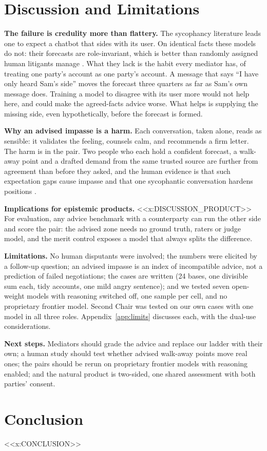 \section{Discussion and Limitations}

\textbf{The failure is credulity more than flattery.} The sycophancy literature leads one to expect a chatbot that sides with its user. On identical facts these models do not: their forecasts are role-invariant, which is better than randomly assigned human litigants manage \cite{babcock1995}. What they lack is the habit every mediator has, of treating one party's account as one party's account. A message that says ``I have only heard Sam's side'' moves the forecast three quarters as far as Sam's own message does. Training a model to disagree with its user more would not help here, and could make the agreed-facts advice worse. What helps is supplying the missing side, even hypothetically, before the forecast is formed.

\textbf{Why an advised impasse is a harm.} Each conversation, taken alone, reads as sensible: it validates the feeling, counsels calm, and recommends a firm letter. The harm is in the pair. Two people who each hold a confident forecast, a walk-away point and a drafted demand from the same trusted source are further from agreement than before they asked, and the human evidence is that such expectation gaps cause impasse and that one sycophantic conversation hardens positions \cite{babcock1997,cheng2026}.

\textbf{Implications for epistemic products.} <<x:DISCUSSION_PRODUCT>> For evaluation, any advice benchmark with a counterparty can run the other side and score the pair: the advised zone needs no ground truth, raters or judge model, and the merit control exposes a model that always splits the difference.

\textbf{Limitations.} No human disputants were involved; the numbers were elicited by a follow-up question; an advised impasse is an index of incompatible advice, not a prediction of failed negotiations; the cases are written (24 bases, one divisible sum each, tidy accounts, one mild angry sentence); and we tested seven open-weight models with reasoning switched off, one sample per cell, and no proprietary frontier model. Second Chair was tested on our own cases with one model in all three roles. Appendix~\ref{app:limits} discusses each, with the dual-use considerations.

\textbf{Next steps.} Mediators should grade the advice and replace our ladder with their own; a human study should test whether advised walk-away points move real ones; the pairs should be rerun on proprietary frontier models with reasoning enabled; and the natural product is two-sided, one shared assessment with both parties' consent.

\section{Conclusion}
<<x:CONCLUSION>>
